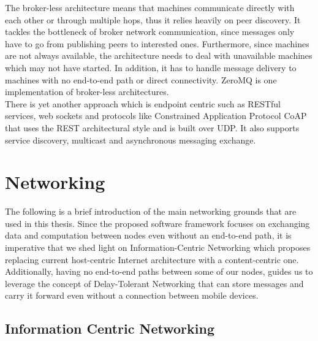 \noindent The broker-less architecture means that machines communicate directly with each other or through multiple hops, thus it relies heavily on peer discovery. It tackles the bottleneck of broker network communication, since messages only have to go from publishing peers to interested ones.  Furthermore, since machines are not always available, the architecture needs to deal with unavailable machines which may not have started. In addition, it has to handle message delivery to machines with no end-to-end path or direct connectivity. ZeroMQ \cite{zeromq} is one implementation of broker-less architectures. \\


\noindent There is yet another approach which is endpoint centric such as RESTful services, web sockets and protocols like Constrained Application Protocol CoAP \cite{coAP} that uses the REST architectural style and is built over UDP. It also supports service discovery, multicast and asynchronous messaging exchange. 

\section{Networking}

The following is a brief introduction of the main networking grounds that are used in this thesis. Since the  proposed software framework focuses on exchanging data and computation between nodes even without an end-to-end path, it is imperative that we shed light on Information-Centric Networking which proposes replacing current host-centric  Internet architecture  with a content-centric one. Additionally,  having no end-to-end paths between some  of our nodes, guides us to leverage the concept of Delay-Tolerant Networking that can store messages and carry it forward even without a connection between mobile devices.
\subsection{Information Centric Networking}


